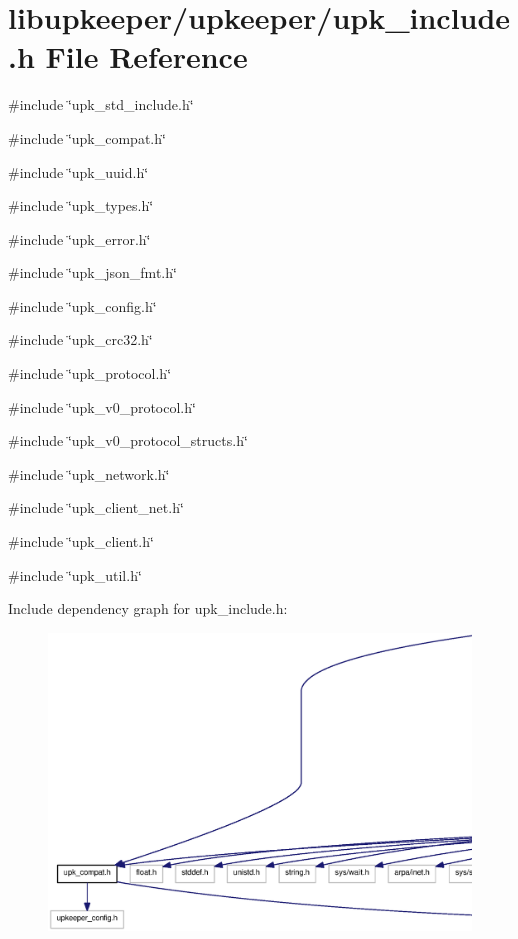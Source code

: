 \section{libupkeeper/upkeeper/upk\_\-include.h File Reference}
\label{upk__include_8h}
{\ttfamily \#include \char`\"{}upk\_\-std\_\-include.h\char`\"{}}\par
{\ttfamily \#include \char`\"{}upk\_\-compat.h\char`\"{}}\par
{\ttfamily \#include \char`\"{}upk\_\-uuid.h\char`\"{}}\par
{\ttfamily \#include \char`\"{}upk\_\-types.h\char`\"{}}\par
{\ttfamily \#include \char`\"{}upk\_\-error.h\char`\"{}}\par
{\ttfamily \#include \char`\"{}upk\_\-json\_\-fmt.h\char`\"{}}\par
{\ttfamily \#include \char`\"{}upk\_\-config.h\char`\"{}}\par
{\ttfamily \#include \char`\"{}upk\_\-crc32.h\char`\"{}}\par
{\ttfamily \#include \char`\"{}upk\_\-protocol.h\char`\"{}}\par
{\ttfamily \#include \char`\"{}upk\_\-v0\_\-protocol.h\char`\"{}}\par
{\ttfamily \#include \char`\"{}upk\_\-v0\_\-protocol\_\-structs.h\char`\"{}}\par
{\ttfamily \#include \char`\"{}upk\_\-network.h\char`\"{}}\par
{\ttfamily \#include \char`\"{}upk\_\-client\_\-net.h\char`\"{}}\par
{\ttfamily \#include \char`\"{}upk\_\-client.h\char`\"{}}\par
{\ttfamily \#include \char`\"{}upk\_\-util.h\char`\"{}}\par
Include dependency graph for upk\_\-include.h:\nopagebreak
\begin{figure}[H]
\begin{center}
\leavevmode
\includegraphics[width=400pt]{upk__include_8h__incl}
\end{center}
\end{figure}
